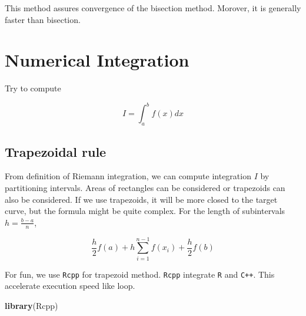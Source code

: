 \documentclass[]{book}
\newenvironment{Shaded}{\begin{snugshade}}{\end{snugshade}}
\newcommand{\CommentTok}[1]{\textcolor[rgb]{0.56,0.35,0.01}{\textit{#1}}}
\newcommand{\DataTypeTok}[1]{\textcolor[rgb]{0.13,0.29,0.53}{#1}}
\newcommand{\DecValTok}[1]{\textcolor[rgb]{0.00,0.00,0.81}{#1}}
\newcommand{\FloatTok}[1]{\textcolor[rgb]{0.00,0.00,0.81}{#1}}
\newcommand{\KeywordTok}[1]{\textcolor[rgb]{0.13,0.29,0.53}{\textbf{#1}}}
\newcommand{\NormalTok}[1]{#1}
\newcommand{\StringTok}[1]{\textcolor[rgb]{0.31,0.60,0.02}{#1}}
\theoremstyle{definition}
\theoremstyle{definition}
\theoremstyle{definition}
\theoremstyle{remark}
\begin{document}
\begin{Shaded}
\end{Shaded}

This method assures convergence of the bisection method. Morover, it is generally faster than bisection.

\hypertarget{numerical-integration}{%
\section{Numerical Integration}\label{numerical-integration}}

Try to compute

\[I = \int_a^b f(x) dx\]

\hypertarget{trapezoidal-rule}{%
\subsection{Trapezoidal rule}\label{trapezoidal-rule}}

From definition of Riemann integration, we can compute integration \(I\) by partitioning intervals. Areas of rectangles can be considered or trapezoids can also be considered. If we use trapezoids, it will be more closed to the target curve, but the formula might be quite complex. For the length of subintervals \(h = \frac{b - a}{n}\),

\begin{equation}
  \frac{h}{2} f(a) + h \sum_{i = 1}^{n - 1} f(x_i) + \frac{h}{2} f(b)
  \label{eq:trape}
\end{equation}

For fun, we use \texttt{Rcpp} for trapezoid method. \texttt{Rcpp} integrate \texttt{R} and \texttt{C++}. This accelerate execution speed like loop.

\begin{Shaded}
\begin{Highlighting}[]
\KeywordTok{library}\NormalTok{(Rcpp)}
\end{Highlighting}
\end{Shaded}
\end{document}
